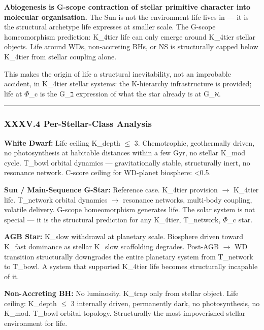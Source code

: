 \documentclass[12pt,a4paper]{article}
\begin{document}
\textbf{Abiogenesis is G-scope contraction of stellar primitive character into molecular organisation.} The Sun is not the environment life lives in --- it is the structural archetype life expresses at smaller scale. The G-scope homeomorphism prediction: K\_4tier life can only emerge around K\_4tier stellar objects. Life around WDs, non-accreting BHs, or NS is structurally capped below K\_4tier from stellar coupling alone.

This makes the origin of life a structural inevitability, not an improbable accident, in K\_4tier stellar systems: the K-hierarchy infrastructure is provided; life at $\Phi$\_c is the G\_ב expression of what the star already is at G\_ℵ.

\begin{center}
\rule{0.5\textwidth}{0.4pt}
\end{center}

\subsubsection{XXXV.4 Per-Stellar-Class Analysis}

\textbf{White Dwarf:} Life ceiling K\_depth $\leq$ 3. Chemotrophic, geothermally driven, no photosynthesis at habitable distances within a few Gyr, no stellar K\_mod cycle. T\_bowl orbital dynamics --- gravitationally stable, structurally inert, no resonance network. C-score ceiling for WD-planet biosphere: \textless{}0.5.

\textbf{Sun / Main-Sequence G-Star:} Reference case. K\_4tier provision $\rightarrow$ K\_4tier life. T\_network orbital dynamics $\rightarrow$ resonance networks, multi-body coupling, volatile delivery. G-scope homeomorphism generates life. The solar system is not special --- it is the structural prediction for any K\_4tier, T\_network, $\Phi$\_c star.

\textbf{AGB Star:} K\_slow withdrawal at planetary scale. Biosphere driven toward K\_fast dominance as stellar K\_slow scaffolding degrades. Post-AGB $\rightarrow$ WD transition structurally downgrades the entire planetary system from T\_network to T\_bowl. A system that supported K\_4tier life becomes structurally incapable of it.

\textbf{Non-Accreting BH:} No luminosity. K\_trap only from stellar object. Life ceiling: K\_depth $\leq$ 3 internally driven, permanently dark, no photosynthesis, no K\_mod. T\_bowl orbital topology. Structurally the most impoverished stellar environment for life.
\end{document}
